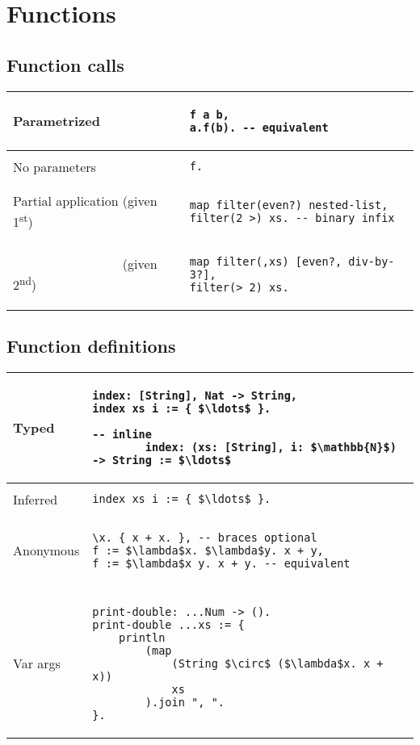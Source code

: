 \documentclass[a4paper,12pt]{article}
\makeatletter
\newcommand{\code}{\lstinline}
\newcommand{\br}{\\ [0.5em] \hline \\ [-0.5em]}
\newenvironment{data}
    {
        \begin{center}
        \begin{tabular*}{\textwidth}{ l@{\extracolsep{\fill}}l }
    }
    {
        \end{tabular*}
        \end{center}
    }
\makeatother
\begin{document}
\section{Functions}
\subsection{Function calls}
\begin{data}
    Parametrized  &
        \begin{lstlisting}
f a b,
a.f(b). -- equivalent
        \end{lstlisting} \br
    No parameters &
        \code|f.|     \br
    Partial application (given 1\textsuperscript{st}) &
        \begin{lstlisting}
map filter(even?) nested-list,
filter(2 >) xs. -- binary infix
        \end{lstlisting} \\
    \textcolor{white}{
    Partial application} (given 2\textsuperscript{nd}) &
        \begin{lstlisting}
map filter(,xs) [even?, div-by-3?],
filter(> 2) xs.
        \end{lstlisting}
\end{data}

\subsection{Function definitions}
\begin{data}
    Typed &
        \begin{lstlisting}[mathescape=true]
index: [String], Nat -> String,
index xs i := { $\ldots$ }.

-- inline
        index: (xs: [String], i: $\mathbb{N}$) -> String := $\ldots$
        \end{lstlisting} \br
    Inferred &
        \code[mathescape=true]|index xs i := { $\ldots$ }.|\br
    Anonymous &
        \begin{lstlisting}[mathescape=true]
\x. { x + x. }, -- braces optional
f := $\lambda$x. $\lambda$y. x + y,
f := $\lambda$x y. x + y. -- equivalent
        \end{lstlisting} \br
    Var args &
        \begin{lstlisting}[mathescape=true]
print-double: ...Num -> ().
print-double ...xs := {
    println 
        (map 
            (String $\circ$ ($\lambda$x. x + x)) 
            xs
        ).join ", ".
}.
        \end{lstlisting}
\end{data}
\end{document}
